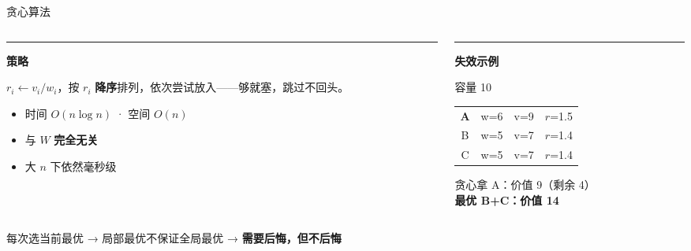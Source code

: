 \documentclass[9pt]{ctexbeamer}
\newenvironment{leftblock}[1]{%
  \vspace{0.3cm}
  \begin{beamercolorbox}[wd=\textwidth,leftskip=0.4cm,rightskip=0.4cm]{}
    \textcolor{ember}{\rule{2.5pt}{0.55cm}}\hspace{0.2cm}
    {\bfseries\color{ink}#1}
    \par\vspace{0.1cm}
    \hspace{0.35cm}\begin{minipage}{\dimexpr\textwidth-1.2cm\relax}
}{%
    \end{minipage}
  \end{beamercolorbox}
  \vspace{0.15cm}
}
\newcommand{\hi}[1]{\textcolor{ember}{\textbf{#1}}}
\newcommand{\blu}[1]{\textcolor{accent}{\textbf{#1}}}
\begin{document}
\begin{frame}{贪心算法}

\begin{columns}[T]
\begin{column}{0.5\textwidth}

\begin{leftblock}{策略}
$r_i \gets v_i/w_i$，按 $r_i$ \hi{降序}排列，依次尝试放入——够就塞，跳过不回头。
\end{leftblock}

\vspace{0.1cm}
\begin{itemize}
  \item 时间 $O(n\log n)$ · 空间 $O(n)$
  \item 与 $W$ \hi{完全无关}
  \item 大 $n$ 下依然毫秒级
\end{itemize}

\end{column}
\begin{column}{0.5\textwidth}

\begin{leftblock}{失效示例}
容量 10
\vspace{0.05cm}
\begin{tabular}{cccc}
\hi{A} & w=6 & v=9  & $r$=1.5 \\
B     & w=5 & v=7  & $r$=1.4 \\
C     & w=5 & v=7  & $r$=1.4 \\
\end{tabular}
\par\vspace{0.1cm}
贪心拿 A：价值 9（剩余 4）\\
\blu{最优 B+C：价值 14}
\end{leftblock}

\end{column}
\end{columns}

\vspace{0.2cm}
\begin{center}
{\small\color{slate}每次选当前最优 → 局部最优不保证全局最优 → \hi{需要后悔，但不后悔}}
\end{center}

\end{frame}
\end{document}
